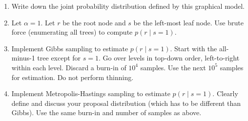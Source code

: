 \documentclass{article}
\begin{document}
\begin{enumerate}
  \begin{enumerate}
  \item Write down the joint probability distribution defined by this graphical model.
  \item Let $\alpha=1$.  Let $r$ be the root node and $s$ be the left-most leaf node.
  Use brute force (enumerating all trees) to compute $p(r \mid s=1)$.
  \item Implement Gibbs sampling to estimate $p(r \mid s=1)$.  Start with the all-minus-1 tree except for $s=1$.  Go over levels in top-down order, left-to-right within each level.
  Discard a burn-in of $10^4$ samples.  Use the next $10^5$ samples for estimation.  Do not perform thinning.
  \item Implement Metropolis-Hastings sampling to estimate $p(r \mid s=1)$.  Clearly define and discuss your proposal distribution (which has to be different than Gibbs).  Use the same burn-in and number of samples as above.
  \end{enumerate}



\end{enumerate}
\end{document}
